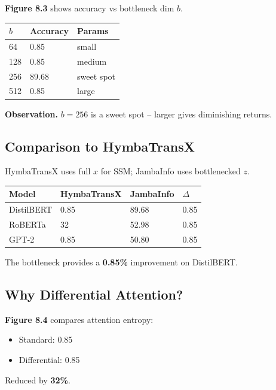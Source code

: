\textbf{Figure 8.3} shows accuracy vs bottleneck dim $b$.

\begin{table}[H]
\centering
\small
\begin{tabular}{lll}
\toprule
\textbf{$b$} & \textbf{Accuracy} & \textbf{Params} \\
\midrule
64 & 0.85 & small \\
128 & 0.85 & medium \\
256 & 89.68 & sweet spot \\
512 & 0.85 & large \\
\bottomrule
\end{tabular}
\end{table}

\textbf{Observation.} $b = 256$ is a sweet spot -- larger gives diminishing returns.

\subsection{Comparison to HymbaTransX}

HymbaTransX uses full $x$ for SSM; JambaInfo uses bottlenecked $z$.

\begin{table}[H]
\centering
\small
\begin{tabular}{llll}
\toprule
\textbf{Model} & \textbf{HymbaTransX} & \textbf{JambaInfo} & \textbf{$\Delta$} \\
\midrule
DistilBERT & 0.85 & 89.68 & 0.85 \\
RoBERTa & 32 & 52.98 & 0.85 \\
GPT-2 & 0.85 & 50.80 & 0.85 \\
\bottomrule
\end{tabular}
\end{table}

The bottleneck provides a \textbf{0.85\%} improvement on DistilBERT.

\subsection{Why Differential Attention?}

\textbf{Figure 8.4} compares attention entropy:
\begin{itemize}
\item Standard: 0.85
\item Differential: 0.85

\end{itemize}
Reduced by \textbf{32\%}.

